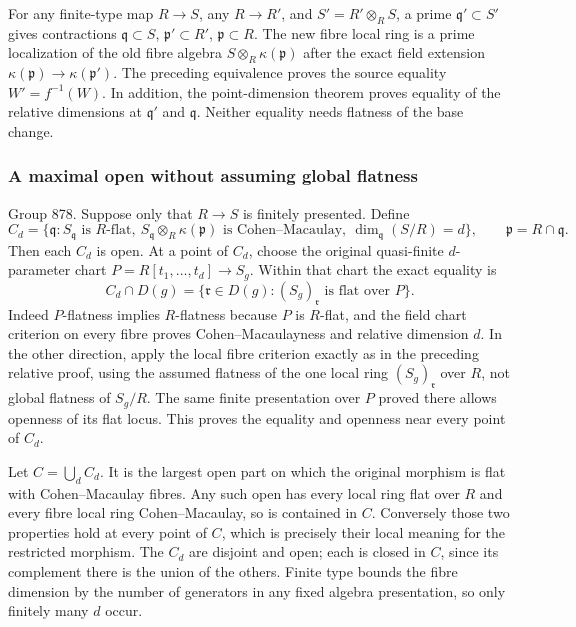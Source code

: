 For any finite-type map \(R\to S\), any \(R\to R'\), and \(S'=R'\otimes_R S\), a prime \(\mathfrak q'\subset S'\) gives contractions \(\mathfrak q\subset S\), \(\mathfrak p'\subset R'\), \(\mathfrak p\subset R\). The new fibre local ring is a prime localization of the old fibre algebra \(S\otimes_R\kappa(\mathfrak p)\) after the exact field extension \(\kappa(\mathfrak p)\to\kappa(\mathfrak p')\). The preceding equivalence proves the source equality \(W'=f^{-1}(W)\). In addition, the point-dimension theorem proves equality of the relative dimensions at \(\mathfrak q'\) and \(\mathfrak q\). Neither equality needs flatness of the base change.

\subsubsection{A maximal open without assuming global flatness}\label{algebra-proof-040-a-maximal-open-without-assuming-global-flatness}

Group 878. Suppose only that \(R\to S\) is finitely presented. Define \[
C_d=\{\mathfrak q:S_{\mathfrak q}\text{ is }R\text{-flat},
\ S_{\mathfrak q}\otimes_R\kappa(\mathfrak p)\text{ is Cohen–Macaulay},
\ \dim_{\mathfrak q}(S/R)=d\},
\qquad \mathfrak p=R\cap\mathfrak q.
\] Then each \(C_d\) is open. At a point of \(C_d\), choose the original quasi-finite \(d\)-parameter chart \(P=R[t_1,\ldots,t_d]\to S_g\). Within that chart the exact equality is \[
C_d\cap D(g)
=\{\mathfrak r\in D(g):(S_g)_{\mathfrak r}
       \text{ is flat over }P\}.
\] Indeed \(P\)-flatness implies \(R\)-flatness because \(P\) is \(R\)-flat, and the field chart criterion on every fibre proves Cohen--Macaulayness and relative dimension \(d\). In the other direction, apply the local fibre criterion exactly as in the preceding relative proof, using the assumed flatness of the one local ring \((S_g)_{\mathfrak r}\) over \(R\), not global flatness of \(S_g/R\). The same finite presentation over \(P\) proved there allows openness of its flat locus. This proves the equality and openness near every point of \(C_d\).

Let \(C=\bigcup_d C_d\). It is the largest open part on which the original morphism is flat with Cohen--Macaulay fibres. Any such open has every local ring flat over \(R\) and every fibre local ring Cohen--Macaulay, so is contained in \(C\). Conversely those two properties hold at every point of \(C\), which is precisely their local meaning for the restricted morphism. The \(C_d\) are disjoint and open; each is closed in \(C\), since its complement there is the union of the others. Finite type bounds the fibre dimension by the number of generators in any fixed algebra presentation, so only finitely many \(d\) occur.


